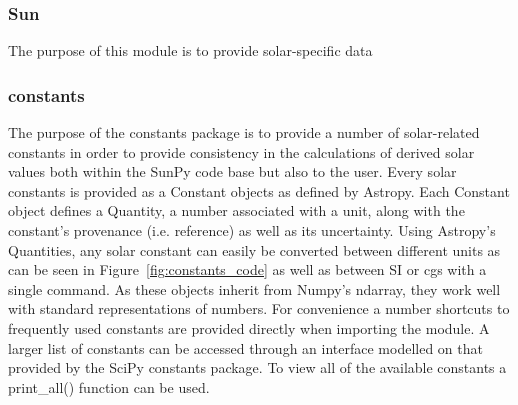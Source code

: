 \subsubsection{Sun}
The purpose of this module is to provide solar-specific data

\subsubsection{constants}
The purpose of the constants package is to provide a number of solar-related constants 
in order to provide consistency in the calculations of derived solar values both within the
SunPy code base but also to the user. Every solar constants is provided as a Constant objects as defined by Astropy. 
Each Constant object defines a Quantity, a number associated with a unit, along with the constant's provenance
(i.e. reference) as well as its uncertainty. Using Astropy's Quantities, any solar constant
can easily be converted between different units as can be seen in Figure~\ref{fig:constants_code} as well
as between SI or cgs with a single command.  As these objects inherit from Numpy's ndarray,
they work well with standard representations of numbers.
For convenience a number shortcuts to frequently used constants are provided directly when importing
the module. A larger list of constants can be accessed through an interface modelled 
on that provided by the SciPy constants package. To view all of the available constants
a print_all() function can be used.


	